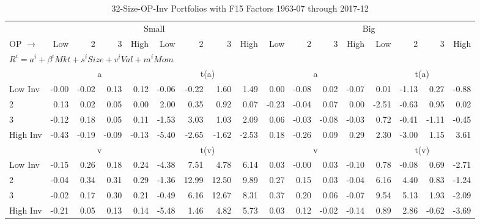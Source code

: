 
\begin{table}[!ht]
\footnotesize
\centering
\caption{32-Size-OP-Inv Portfolios with F15 Factors 1963-07 through 2017-12}
\begin{tabular}{lrrrrrrrrrrrrrrrr}
  \toprule
    & \multicolumn{8}{c}{Small} & \multicolumn{8}{c}{Big} \\
      \cmidrule(r){2-9} \cmidrule(r){10-17}
    OP $\rightarrow$ & Low & 2 & 3 & High & Low & 2 & 3 & High & Low & 2 & 3 & High & Low & 2 & 3 & High \\ 
  \midrule
  \multicolumn{17}{l}{$R^i=a^i+\beta^iMkt+s^iSize+v^iVal+m^iMom$} \\

  
    
      & \multicolumn{4}{c}{a} & \multicolumn{4}{c}{t(a)}
    
      & \multicolumn{4}{c}{a} & \multicolumn{4}{c}{t(a)}
    
    \\
      \cmidrule(r){2-5} \cmidrule(r){6-9} \cmidrule(r){10-13} \cmidrule(r){14-17}

    Low Inv   & -0.00  & -0.02  & 0.13  & 0.12  & -0.06  & -0.22  & 1.60  & 1.49  & 0.00  & -0.08  & 0.02  & -0.07  & 0.01  & -1.13  & 0.27  & -0.88  \\
           2  & 0.13  & 0.02  & 0.05  & 0.00  & 2.00  & 0.35  & 0.92  & 0.07  & -0.23  & -0.04  & 0.07  & 0.00  & -2.51  & -0.63  & 0.95  & 0.02  \\
           3  & -0.12  & 0.18  & 0.05  & 0.11  & -1.53  & 3.03  & 1.03  & 2.09  & 0.06  & -0.03  & -0.08  & -0.03  & 0.72  & -0.41  & -1.11  & -0.45  \\
    High Inv  & -0.43  & -0.19  & -0.09  & -0.13  & -5.40  & -2.65  & -1.62  & -2.53  & 0.18  & -0.26  & 0.09  & 0.29  & 2.30  & -3.00  & 1.15  & 3.61  \\

  
    
      & \multicolumn{4}{c}{v} & \multicolumn{4}{c}{t(v)}
    
      & \multicolumn{4}{c}{v} & \multicolumn{4}{c}{t(v)}
    
    \\
      \cmidrule(r){2-5} \cmidrule(r){6-9} \cmidrule(r){10-13} \cmidrule(r){14-17}

    Low Inv   & -0.15  & 0.26  & 0.18  & 0.24  & -4.38  & 7.51  & 4.78  & 6.14  & 0.03  & -0.00  & 0.03  & -0.10  & 0.78  & -0.08  & 0.69  & -2.71  \\
           2  & -0.04  & 0.34  & 0.31  & 0.29  & -1.36  & 12.99  & 12.50  & 9.89  & 0.27  & 0.15  & 0.03  & -0.04  & 6.16  & 4.40  & 0.83  & -1.24  \\
           3  & -0.02  & 0.17  & 0.30  & 0.21  & -0.49  & 6.16  & 12.67  & 8.31  & 0.37  & 0.20  & 0.06  & -0.07  & 9.54  & 5.13  & 1.93  & -2.09  \\
    High Inv  & -0.21  & 0.05  & 0.13  & 0.14  & -5.48  & 1.46  & 4.82  & 5.73  & 0.03  & 0.12  & -0.02  & -0.14  & 0.89  & 2.86  & -0.62  & -3.69  \\


\end{tabular}
\end{table}
